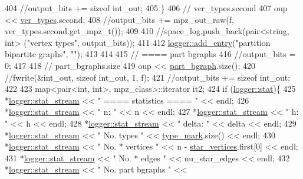 \begin{DoxyCode}
404     \textcolor{comment}{//output\_bits += sizeof int\_out;}
405   \}
406   \textcolor{comment}{// ver\_types.second}
407   oup << \hyperlink{classmarked__graph__compressed_af446cc5e23c241a92b76642fd5ebc403}{ver\_types}.second;
408   \textcolor{comment}{//output\_bits += mpz\_out\_raw(f, ver\_types.second.get\_mpz\_t());}
409 
410   \textcolor{comment}{//space\_log.push\_back(pair<string, int> ("vertex types", output\_bits));}
411 
412   \hyperlink{classlogger_a710163deb17bc81f70d53d285b8ac9ac}{logger::add\_entry}(\textcolor{stringliteral}{"partition bipartite graphs"}, \textcolor{stringliteral}{""});
413   
414 
415   \textcolor{comment}{// ==== part bgraphs}
416   \textcolor{comment}{//output\_bits = 0;}
417 
418   \textcolor{comment}{// part\_bgraphs.size}
419   oup << \hyperlink{classmarked__graph__compressed_a7b3267063fba30b45eb21b3ba4e07536}{part\_bgraph}.size();
420   \textcolor{comment}{//fwrite(&int\_out, sizeof int\_out, 1, f);}
421   \textcolor{comment}{//output\_bits += sizeof int\_out;}
422 
423   map<pair<int, int>, mpz\_class>::iterator it2;
424   \textcolor{keywordflow}{if} (\hyperlink{classlogger_a26812b5ba03f130e8dae3446d5fc032f}{logger::stat})\{
425     *\hyperlink{classlogger_a7db37821f875f2ba3540980b355779f5}{logger::stat\_stream} << \textcolor{stringliteral}{" ==== statistics ==== "} << endl;
426     *\hyperlink{classlogger_a7db37821f875f2ba3540980b355779f5}{logger::stat\_stream} << \textcolor{stringliteral}{" n:                "} << n << endl;
427     *\hyperlink{classlogger_a7db37821f875f2ba3540980b355779f5}{logger::stat\_stream} << \textcolor{stringliteral}{" h:                "} << h << endl;
428     *\hyperlink{classlogger_a7db37821f875f2ba3540980b355779f5}{logger::stat\_stream} << \textcolor{stringliteral}{" delta:            "} << delta << endl;
429     *\hyperlink{classlogger_a7db37821f875f2ba3540980b355779f5}{logger::stat\_stream} << \textcolor{stringliteral}{" No. types         "} << 
      \hyperlink{classmarked__graph__compressed_a86b00223525703e973415cbc9c94da68}{type\_mark}.size() << endl;
430     *\hyperlink{classlogger_a7db37821f875f2ba3540980b355779f5}{logger::stat\_stream} << \textcolor{stringliteral}{" No. * vertices    "} << n - 
      \hyperlink{classmarked__graph__compressed_a7a4ced4586e2e353f9076bd447df5208}{star\_vertices}.first[0] << endl;
431     *\hyperlink{classlogger_a7db37821f875f2ba3540980b355779f5}{logger::stat\_stream} << \textcolor{stringliteral}{" No. * edges       "} << nu\_star\_edges << endl;
432     *\hyperlink{classlogger_a7db37821f875f2ba3540980b355779f5}{logger::stat\_stream} << \textcolor{stringliteral}{" No. part bgraphs  "} << 

\end{DoxyCode}

